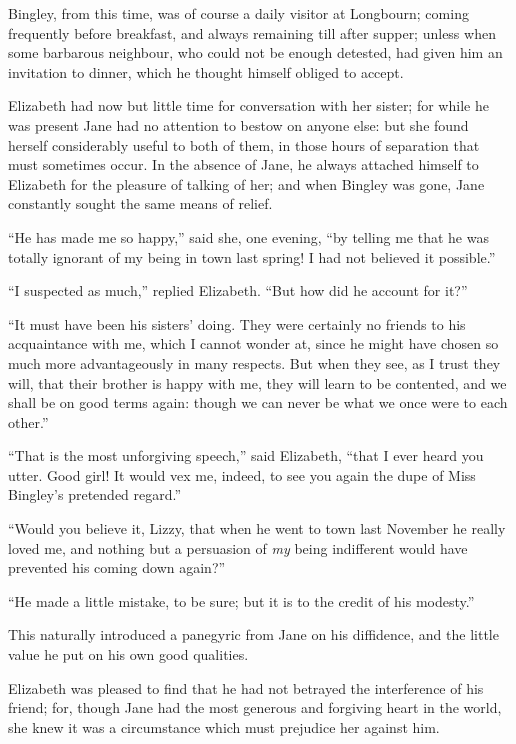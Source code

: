 Bingley, from this time, was of course a daily visitor at Longbourn; coming frequently before breakfast, and always remaining till after supper; unless when some barbarous neighbour, who could not be enough detested, had given him an invitation to dinner, which he thought himself obliged to accept.

Elizabeth had now but little time for conversation with her sister; for while he was present Jane had no attention to bestow on anyone else: but she found herself considerably useful to both of them, in those hours of separation that must sometimes occur. In the absence of Jane, he always attached himself to Elizabeth for the pleasure of talking of her; and when Bingley was gone, Jane constantly sought the same means of relief.

``He has made me so happy,'' said she, one evening, ``by telling me that he was totally ignorant of my being in town last spring! I had not believed it possible.''

``I suspected as much,'' replied Elizabeth. ``But how did he account for it?''

``It must have been his sisters' doing. They were certainly no friends to his acquaintance with me, which I cannot wonder at, since he might have chosen so much more advantageously in many respects. But when they see, as I trust they will, that their brother is happy with me, they will learn to be contented, and we shall be on good terms again: though we can never be what we once were to each other.''

``That is the most unforgiving speech,'' said Elizabeth, ``that I ever heard you utter. Good girl! It would vex me, indeed, to see you again the dupe of Miss Bingley's pretended regard.''

``Would you believe it, Lizzy, that when he went to town last November he really loved me, and nothing but a persuasion of \textit{my} being indifferent would have prevented his coming down again?''

``He made a little mistake, to be sure; but it is to the credit of his modesty.''

This naturally introduced a panegyric from Jane on his diffidence, and the little value he put on his own good qualities.

Elizabeth was pleased to find that he had not betrayed the interference of his friend; for, though Jane had the most generous and forgiving heart in the world, she knew it was a circumstance which must prejudice her against him.

